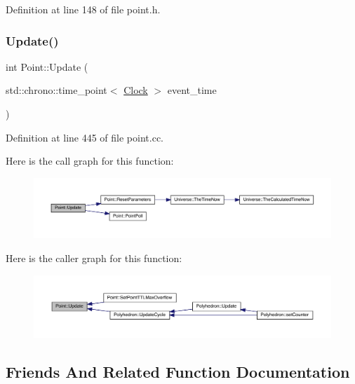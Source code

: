 Definition at line 148 of file point.\+h.

\mbox{\label{class_point_a7ad2d1933410012c59bffbd4ac611279}} 
\subsubsection{\texorpdfstring{Update()}{Update()}}
{\footnotesize\ttfamily int Point\+::\+Update (\begin{DoxyParamCaption}\item[{std\+::chrono\+::time\+\_\+point$<$ \hyperlink{universe_8h_a0ef8d951d1ca5ab3cfaf7ab4c7a6fd80}{Clock} $>$}]{event\+\_\+time }\end{DoxyParamCaption})}



Definition at line 445 of file point.\+cc.

Here is the call graph for this function\+:
\nopagebreak
\begin{figure}[H]
\begin{center}
\leavevmode
\includegraphics[width=350pt]{class_point_a7ad2d1933410012c59bffbd4ac611279_cgraph}
\end{center}
\end{figure}
Here is the caller graph for this function\+:
\nopagebreak
\begin{figure}[H]
\begin{center}
\leavevmode
\includegraphics[width=350pt]{class_point_a7ad2d1933410012c59bffbd4ac611279_icgraph}
\end{center}
\end{figure}


\subsection{Friends And Related Function Documentation}
\mbox{\label{class_point_a9bc6eb2a4c20ce83728a7c9a31b91f19}} 
